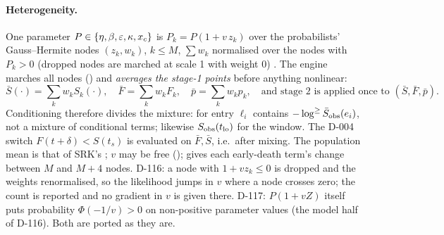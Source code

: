 \paragraph{Heterogeneity.} One parameter $P\in\{\eta,\beta,\varepsilon,\kappa,x_c\}$ is $P_k=P(1+v\,z_k)$ over the
probabilists' Gauss--Hermite nodes $(z_k,w_k)$, $k\le M$, $\sum w_k$ normalised over the nodes with $P_k>0$
(dropped nodes are marched at scale 1 with weight 0) . The
engine marches all nodes () and \emph{averages the stage-1 points} before anything nonlinear:
\begin{equation}
  \bar S(\cdot)=\sum_kw_kS_k(\cdot),\quad\bar F=\sum_kw_kF_k,\quad\bar p=\sum_kw_kp_k,
  \quad\text{and stage 2 is applied once to }(\bar S,\bar F,\bar p).
\end{equation}
Conditioning therefore divides the mixture: for entry $\ell_i$ contains $-\log^{\ge}\bar S_{\rm obs}(e_i)$, not
a mixture of conditional terms; likewise $S_{\rm obs}(t_{\rm lo})$ for the window. The D-004 switch
$F(t+\delta)<S(t_s)$ is evaluated on $\bar F,\bar S$, i.e.\ after mixing. The population mean is that of
SRK's ; $v$ may be free ();  gives each early-death
term's change between $M$ and $M+4$ nodes. D-116: a node with $1+vz_k\le0$ is dropped and the weights renormalised,
so the likelihood jumps in $v$ where a node crosses zero; the count is reported and no gradient in $v$ is given
there. D-117: $P(1+vZ)$ itself puts probability $\Phi(-1/v)>0$ on non-positive parameter values (the model half
of D-116). Both are ported as they are.

